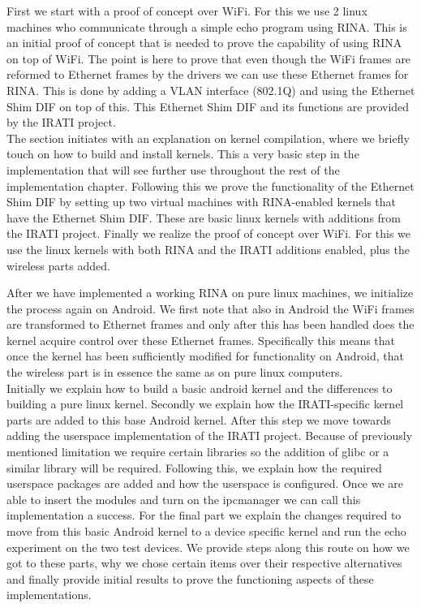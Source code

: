 First we start with a proof of concept over WiFi. For this we use 2 linux machines who communicate through a simple echo program using RINA. This is an initial proof of concept that is needed to prove the capability of using RINA on top of WiFi. The point is here to prove that even though the WiFi frames are reformed to Ethernet frames by the drivers we can use these Ethernet frames for RINA. This is done by adding a VLAN interface (802.1Q) and using the Ethernet Shim DIF on top of this. This Ethernet Shim DIF and its functions are provided by the IRATI project. 
\\
The section initiates with an explanation on kernel compilation, where we briefly touch on how to build and install kernels. This a very basic step in the implementation that will see further use throughout the rest of the implementation chapter. Following this we prove the functionality of the Ethernet Shim DIF by setting up two virtual machines with RINA-enabled kernels that have the Ethernet Shim DIF. These are basic linux kernels with additions from the IRATI project. Finally we realize the proof of concept over WiFi. For this we use the linux kernels with both RINA and the IRATI additions enabled, plus the wireless parts added. 


\npar
After we have implemented a working RINA on pure linux machines, we initialize the process again on Android. We first note that also in Android the WiFi frames are transformed to Ethernet frames and only after this has been handled does the kernel acquire control over these Ethernet frames. Specifically this means that once the kernel has been sufficiently modified for functionality on Android, that the wireless part is in essence the same as on pure linux computers. 
\\
Initially we explain how to build a basic android kernel and the differences to building a pure linux kernel. Secondly we explain how the IRATI-specific kernel parts are added to this base Android kernel. After this step we move towards adding the userspace implementation of the IRATI project. Because of previously mentioned limitation we require certain libraries so the addition of  glibc or a similar library will be required. Following this, we explain how the required userspace packages are added and how the userspace is configured. Once we are able to insert the modules and turn on the ipcmanager we can call this implementation a success. For the final part we explain the changes required to move from this basic Android kernel to a device specific kernel and run the echo experiment on the two test devices. 
\npar
We provide steps along this route on how we got to these parts, why we chose certain items over their respective alternatives and finally provide initial results to prove the functioning aspects of these implementations. 


